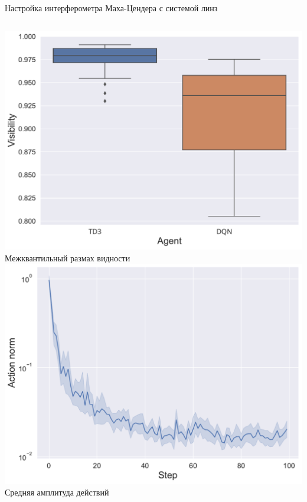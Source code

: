 \begin{frame}[allowframebreaks]{Настройка интерферометра Маха-Цендера с системой линз}
\framebreak 

\begin{columns}
\centering
\includegraphics[width=1\linewidth]{images/DQN_vs_TD3_box.pdf}
Межквантильный размах видности
\centering
\includegraphics[width=1\linewidth]{images/action_norm_decrease.pdf}
Средняя амплитуда действий
\end{columns}

\framebreak


\end{frame}
